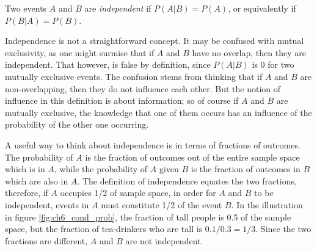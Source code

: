 \documentclass[
  letterpaper,
  DIV=11,
  numbers=noendperiod]{scrreprt}
\begin{document}
\begin{tcolorbox}[enhanced jigsaw, arc=.35mm, colframe=quarto-callout-note-color-frame, left=2mm, opacitybacktitle=0.6, breakable, title=\textcolor{quarto-callout-note-color}{\faInfo}\hspace{0.5em}{Definition}, toprule=.15mm, coltitle=black, bottomtitle=1mm, toptitle=1mm, colback=white, leftrule=.75mm, colbacktitle=quarto-callout-note-color!10!white, titlerule=0mm, opacityback=0, rightrule=.15mm, bottomrule=.15mm]

Two events \(A\) and \(B\) are \emph{independent} if \(P(A|B) = P(A)\),
or equivalently if \(P(B|A) = P(B)\).

\end{tcolorbox}

Independence is not a straightforward concept. It may be confused with
mutual exclusivity, as one might surmise that if \(A\) and \(B\) have no
overlap, then they are independent. That however, is false by
definition, since \(P(A|B)\) is 0 for two mutually exclusive events. The
confusion stems from thinking that if \(A\) and \(B\) are
non-overlapping, then they do not influence each other. But the notion
of influence in this definition is about information; so of course if
\(A\) and \(B\) are mutually exclusive, the knowledge that one of them
occurs has an influence of the probability of the other one occurring.

A useful way to think about independence is in terms of fractions of
outcomes. The probability of \(A\) is the fraction of outcomes out of
the entire sample space which is in \(A\), while the probability of
\(A\) given \(B\) is the fraction of outcomes in \(B\) which are also in
\(A\). The definition of independence equates the two fractions,
therefore, if \(A\) occupies 1/2 of sample space, in order for \(A\) and
\(B\) to be independent, events in \(A\) must constitute 1/2 of the
event \(B\). In the illustration in figure \ref{fig:ch6_cond_prob}, the
fraction of tall people is 0.5 of the sample space, but the fraction of
tea-drinkers who are tall is \(0.1/0.3=1/3\). Since the two fractions
are different, \(A\) and \(B\) are not independent.
\end{document}
